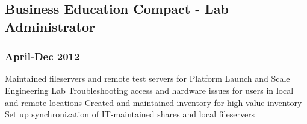 \subsection*{Business Education Compact - Lab Administrator}			
\subsubsection*{April-Dec 2012}

\bullet	Maintained fileservers and remote test servers for Platform Launch and Scale Engineering Lab
\bullet	Troubleshooting access and hardware issues for users in local and remote locations
\bullet	Created and maintained inventory for high-value inventory
\bullet	Set up synchronization of IT-maintained shares and local fileservers


